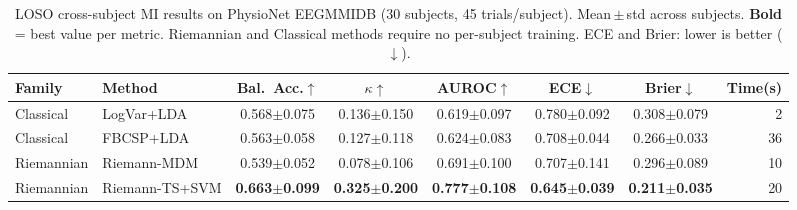 \begin{table}[!t]
\caption{LOSO cross-subject MI results on PhysioNet EEGMMIDB (30 subjects, 45 trials/subject).
Mean\,$\pm$\,std across subjects. \textbf{Bold} = best value per metric.
Riemannian and Classical methods require no per-subject training.
ECE and Brier: lower is better ($\downarrow$).}
\label{tab:results}
\centering\small
\begin{tabular}{llcccccr}
\toprule
Family & Method & Bal.~Acc.$\uparrow$ & $\kappa\uparrow$ & AUROC$\uparrow$ & ECE$\downarrow$ & Brier$\downarrow$ & Time(s) \\
\midrule
Classical   & LogVar+LDA      & 0.568$\pm$0.075 & 0.136$\pm$0.150 & 0.619$\pm$0.097 & 0.780$\pm$0.092 & 0.308$\pm$0.079 & 2 \\
Classical   & FBCSP+LDA       & 0.563$\pm$0.058 & 0.127$\pm$0.118 & 0.624$\pm$0.083 & 0.708$\pm$0.044 & 0.266$\pm$0.033 & 36 \\
Riemannian  & Riemann-MDM     & 0.539$\pm$0.052 & 0.078$\pm$0.106 & 0.691$\pm$0.100 & 0.707$\pm$0.141 & 0.296$\pm$0.089 & 10 \\
Riemannian  & Riemann-TS+SVM  & \textbf{0.663$\pm$0.099} & \textbf{0.325$\pm$0.200} & \textbf{0.777$\pm$0.108} & \textbf{0.645$\pm$0.039} & \textbf{0.211$\pm$0.035} & 20 \\
\bottomrule
\end{tabular}
\end{table}
